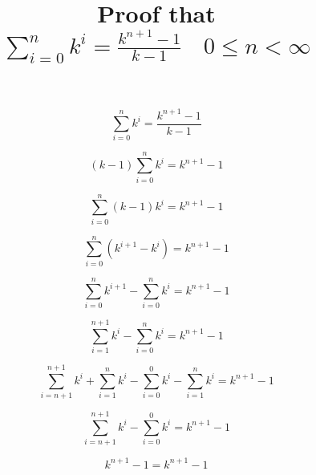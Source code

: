 \documentclass[11pt,fleqn,a4paper]{article}
\newcommand{\mainEquation}{\( \sum\limits_{i=0}^{n} k^i = \frac{k ^{n + 1} - 1}{k - 1} \quad 0 \leq n < \infty  \)}
\begin{document}
\title{Proof that \mainEquation}
\date{}
\maketitle

\[ \sum\limits_{i=0}^{n} k^i = \frac{k ^{n + 1} - 1}{k - 1} \]

\[(k - 1)  \sum\limits_{i=0}^{n} k^i = k ^{n + 1} - 1\]

\[\sum\limits_{i=0}^{n} (k - 1) k^i = k ^{n + 1} - 1\]

\[\sum\limits_{i=0}^{n} (k^{i + 1} - k^i) = k ^{n + 1} - 1\]

\[\sum\limits_{i=0}^{n} k^{i + 1} - \sum\limits_{i=0}^{n} k^i = k ^{n + 1} - 1\]

\[\sum\limits_{i=1}^{n + 1} k^{i} - \sum\limits_{i=0}^{n} k^i = k ^{n + 1} - 1\]

\[\sum\limits_{i=n + 1}^{n + 1} k^{i} + \sum\limits_{i=1}^{n} k^{i} - \sum\limits_{i=0}^{0} k^i  - \sum\limits_{i=1}^{n} k^i = k ^{n + 1} - 1\]

\[\sum\limits_{i=n + 1}^{n + 1} k^{i} - \sum\limits_{i=0}^{0} k^i = k ^{n + 1} - 1\]

\[k ^{n + 1} - 1 = k ^{n + 1} - 1\]
\end{document}
